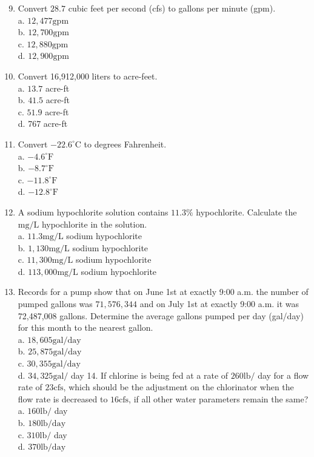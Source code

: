 \documentclass[10pt]{article}
\begin{document}
\begin{enumerate}
  \setcounter{enumi}{8}
  \item Convert $28.7$ cubic feet per second (cfs) to gallons per minute (gpm).\\
a. $12,477 \mathrm{gpm}$\\
b. $12,700 \mathrm{gpm}$\\
c. $12,880 \mathrm{gpm}$\\
d. $12,900 \mathrm{gpm}$

  \item Convert 16,912,000 liters to acre-feet.\\
a. $13.7$ acre-ft\\
b. $41.5$ acre-ft\\
c. $51.9$ acre-ft\\
d. 767 acre-ft

  \item Convert $-22.6^{\circ} \mathrm{C}$ to degrees Fahrenheit.\\
a. $-4.6^{\circ} \mathrm{F}$\\
b. $-8.7^{\circ} \mathrm{F}$\\
c. $-11.8^{\circ} \mathrm{F}$\\
d. $-12.8^{\circ} \mathrm{F}$

  \item A sodium hypochlorite solution contains $11.3 \%$ hypochlorite. Calculate the $\mathrm{mg} / \mathrm{L}$ hypochlorite in the solution.\\
a. $11.3 \mathrm{mg} / \mathrm{L}$ sodium hypochlorite\\
b. $1,130 \mathrm{mg} / \mathrm{L}$ sodium hypochlorite\\
c. $11,300 \mathrm{mg} / \mathrm{L}$ sodium hypochlorite\\
d. $113,000 \mathrm{mg} / \mathrm{L}$ sodium hypochlorite

  \item Records for a pump show that on June 1st at exactly 9:00 a.m. the number of pumped gallons was $71,576,344$ and on July 1st at exactly 9:00 a.m. it was 72,487,008 gallons. Determine the average gallons pumped per day (gal/day) for this month to the nearest gallon.\\
a. $18,605 \mathrm{gal} / \mathrm{day}$\\
b. $25,875 \mathrm{gal} / \mathrm{day}$\\
c. $30,355 \mathrm{gal} / \mathrm{day}$\\
d. $34,325 \mathrm{gal} /$ day 14. If chlorine is being fed at a rate of $260 \mathrm{lb} /$ day for a flow rate of $23 \mathrm{cfs}$, which should be the adjustment on the chlorinator when the flow rate is decreased to $16 \mathrm{cfs}$, if all other water parameters remain the same?\\
a. $160 \mathrm{lb} /$ day\\
b. $180 \mathrm{lb} / \mathrm{day}$\\
c. $310 \mathrm{lb} /$ day\\
d. $370 \mathrm{lb} / \mathrm{day}$


\end{enumerate}
\end{document}
